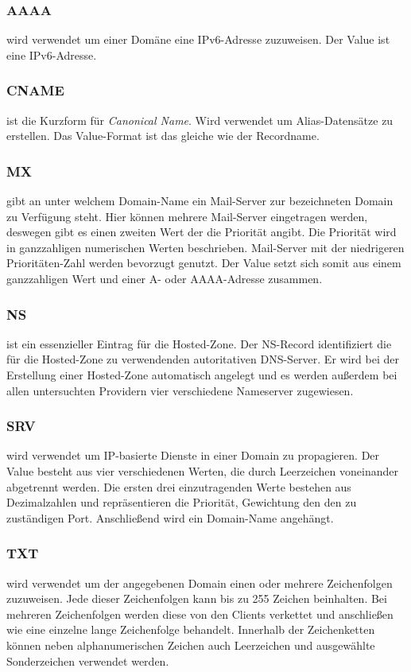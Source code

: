 \subsubsection{AAAA}
wird verwendet um einer Domäne eine IPv6-Adresse zuzuweisen. Der Value ist eine IPv6-Adresse.

\subsubsection{CNAME}
ist die Kurzform für \textit{Canonical Name}. Wird verwendet um Alias-Datensätze zu erstellen. Das Value-Format ist das gleiche wie der Recordname.

\subsubsection{MX}
gibt an unter welchem Domain-Name ein Mail-Server zur bezeichneten Domain zu Verfügung steht. Hier können mehrere Mail-Server eingetragen werden, deswegen gibt es einen zweiten Wert der die Priorität angibt. Die Priorität wird in ganzzahligen numerischen Werten beschrieben. Mail-Server mit der niedrigeren Prioritäten-Zahl werden bevorzugt genutzt. Der Value setzt sich somit aus einem ganzzahligen Wert und einer A- oder AAAA-Adresse zusammen.

\subsubsection{NS}
ist ein essenzieller Eintrag für die Hosted-Zone. Der NS-Record identifiziert die für die Hosted-Zone zu verwendenden autoritativen DNS-Server. Er wird bei der Erstellung einer Hosted-Zone automatisch angelegt und es werden außerdem bei allen untersuchten Providern vier verschiedene Nameserver zugewiesen.

\subsubsection{SRV}
wird verwendet um IP-basierte Dienste in einer Domain zu propagieren. Der Value besteht aus vier verschiedenen Werten, die durch Leerzeichen voneinander abgetrennt werden. Die ersten drei einzutragenden Werte bestehen aus Dezimalzahlen und repräsentieren die Priorität, Gewichtung den den zu zuständigen Port. Anschließend wird ein Domain-Name angehängt.

\subsubsection{TXT}
wird verwendet um der angegebenen Domain einen oder mehrere Zeichenfolgen zuzuweisen. Jede dieser Zeichenfolgen kann bis zu 255 Zeichen beinhalten. Bei mehreren Zeichenfolgen werden diese von den Clients verkettet und anschließen wie eine einzelne lange Zeichenfolge behandelt. Innerhalb der Zeichenketten können neben alphanumerischen Zeichen auch Leerzeichen und ausgewählte Sonderzeichen verwendet werden.

